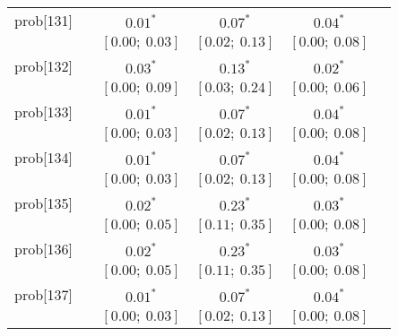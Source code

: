 \begin{table}
\begin{center}
\begin{tabular}{l c c c c c }
prob[131]   &                                  & $0.01^{*}$                & $0.07^{*}$                & $0.04^{*}$              &                         \\
            &                                  & $[0.00;\ 0.03]$           & $[0.02;\ 0.13]$           & $[0.00;\ 0.08]$         &                         \\
prob[132]   &                                  & $0.03^{*}$                & $0.13^{*}$                & $0.02^{*}$              &                         \\
            &                                  & $[0.00;\ 0.09]$           & $[0.03;\ 0.24]$           & $[0.00;\ 0.06]$         &                         \\
prob[133]   &                                  & $0.01^{*}$                & $0.07^{*}$                & $0.04^{*}$              &                         \\
            &                                  & $[0.00;\ 0.03]$           & $[0.02;\ 0.13]$           & $[0.00;\ 0.08]$         &                         \\
prob[134]   &                                  & $0.01^{*}$                & $0.07^{*}$                & $0.04^{*}$              &                         \\
            &                                  & $[0.00;\ 0.03]$           & $[0.02;\ 0.13]$           & $[0.00;\ 0.08]$         &                         \\
prob[135]   &                                  & $0.02^{*}$                & $0.23^{*}$                & $0.03^{*}$              &                         \\
            &                                  & $[0.00;\ 0.05]$           & $[0.11;\ 0.35]$           & $[0.00;\ 0.08]$         &                         \\
prob[136]   &                                  & $0.02^{*}$                & $0.23^{*}$                & $0.03^{*}$              &                         \\
            &                                  & $[0.00;\ 0.05]$           & $[0.11;\ 0.35]$           & $[0.00;\ 0.08]$         &                         \\
prob[137]   &                                  & $0.01^{*}$                & $0.07^{*}$                & $0.04^{*}$              &                         \\
            &                                  & $[0.00;\ 0.03]$           & $[0.02;\ 0.13]$           & $[0.00;\ 0.08]$         &                         \\

\end{tabular}
\end{center}
\end{table}
